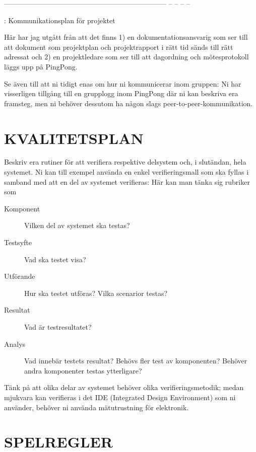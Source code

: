 \documentclass[a4paper]{article}
\begin{document}
  --------------------------------------------------------------------- -- -- -- --

  : Kommunikationsplan för projektet

Här har jag utgått från att det finns 1) en dokumentationsansvarig som
ser till att dokument som projektplan och projektrapport i rätt tid
sänds till rätt adressat och 2) en projektledare som ser till att
dagordning och mötesprotokoll läggs upp på PingPong.

Se även till att ni tidigt enas om hur ni kommunicerar inom gruppen:
Ni har visserligen tillgång till en grupplogg inom PingPong där ni kan
beskriva era framsteg, men ni behöver dessutom ha någon slags
peer-to-peer-kommunikation.



\section{KVALITETSPLAN}
\label{sec:kval}



Beskriv era rutiner för att verifiera respektive delsystem och, i
slutändan, hela systemet. Ni kan till exempel använda en enkel
verifieringsmall som ska fyllas i samband med att en del av systemet
verifieras: Här kan man tänka sig rubriker som

\begin{description}
    \item[Komponent]
    Vilken del av systemet ska testas?

    \item[Testsyfte]
    Vad ska testet visa?

    \item[Utförande]
    Hur ska testet utföras? Vilka scenarior testas?

    \item[Resultat]
    Vad är testresultatet?

    \item[Analys]
    Vad innebär testets resultat? Behövs fler test av komponenten?
    Behöver andra komponenter testas ytterligare?
\end{description}

Tänk på att olika delar av systemet behöver olika verifieringsmetodik;
medan mjukvara kan verifieras i det IDE (Integrated Design Environment)
som ni använder, behöver ni använda mätutrustning för elektronik.



\section{SPELREGLER}
\label{sec:spelregler}
\end{document}
